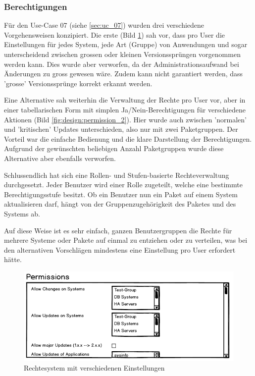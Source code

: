 \subsubsection*{Berechtigungen} \label{sec:design:permissions}

Für den Use-Case 07 (siehe \ref{sec:uc_07}) wurden drei verschiedene Vorgehensweisen konzipiert. Die erste (Bild \ref{fig:design:permission_1}) sah vor, dass pro User die Einstellungen für jedes System, jede Art (Gruppe) von Anwendungen und sogar unterscheidend zwischen grossen oder kleinen Versionssprüngen vorgenommen werden kann. Dies wurde aber verworfen, da der Administrationsaufwand bei Änderungen zu gross gewesen wäre. Zudem kann nicht garantiert werden, dass 'grosse' Versionssprünge korrekt erkannt werden.

Eine Alternative sah weiterhin die Verwaltung der Rechte pro User vor, aber in einer tabellarischen Form mit simplen Ja/Nein-Berechtigungen für verschiedene Aktionen (Bild \ref{fig:design:permission_2}). Hier wurde auch zwischen 'normalen' und 'kritischen' Updates unterschieden, also nur mit zwei Paketgruppen. Der Vorteil war die einfache Bedienung und die klare Darstellung der Berechtigungen. Aufgrund der gewünschten beliebigen Anzahl Paketgruppen wurde diese Alternative aber ebenfalls verworfen.

Schlussendlich hat sich eine Rollen- und Stufen-basierte Rechteverwaltung durchgesetzt. Jeder Benutzer wird einer Rolle zugeteilt, welche eine bestimmte Berechtigungsstufe besitzt. Ob ein Benutzer nun ein Paket auf einem System aktualisieren darf, hängt von der Gruppenzugehörigkeit des Paketes und des Systems ab.

Auf diese Weise ist es sehr einfach, ganzen Benutzergruppen die Rechte für mehrere Systeme oder Pakete auf einmal zu entziehen oder zu verteilen, was bei den alternativen Vorschlägen mindestens eine Einstellung pro User erfordert hätte.

\begin{figure}[H]
	\centering
	\includegraphics[width=0.75\linewidth]{files/mockups/permission_1}
	\caption{Rechtesystem mit verschiedenen Einstellungen}
	\label{fig:design:permission_1}
\end{figure}

